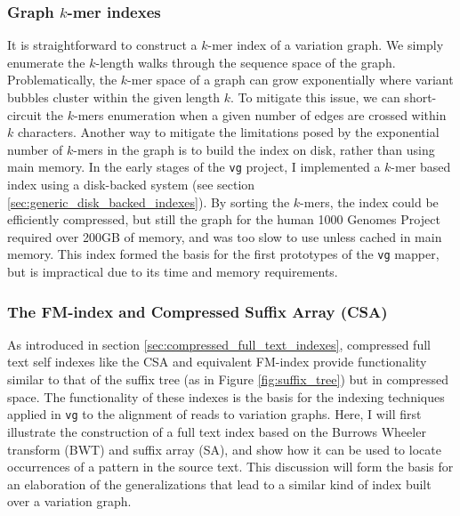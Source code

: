 \subsubsection{Graph $k$-mer indexes}

It is straightforward to construct a $k$-mer index of a variation graph.
We simply enumerate the $k$-length walks through the sequence space of the graph.
Problematically, the $k$-mer space of a graph can grow exponentially where variant bubbles cluster within the given length $k$.
To mitigate this issue, we can short-circuit the $k$-mers enumeration when a given number of edges are crossed within $k$ characters.
Another way to mitigate the limitations posed by the exponential number of $k$-mers in the graph is to build the index on disk, rather than using main memory.
In the early stages of the {\tt vg} project, I implemented a $k$-mer based index using a disk-backed system (see section \ref{sec:generic_disk_backed_indexes}).
By sorting the $k$-mers, the index could be efficiently compressed, but still the graph for the human 1000 Genomes Project required over 200GB of memory, and was too slow to use unless cached in main memory.
This index formed the basis for the first prototypes of the {\tt vg} mapper, but is impractical due to its time and memory requirements.

\subsubsection{The FM-index and Compressed Suffix Array (CSA)}
\label{sec:fmidx_csa}

As introduced in section \ref{sec:compressed_full_text_indexes}, compressed full text self indexes like the CSA and equivalent FM-index provide functionality similar to that of the suffix tree (as in Figure \ref{fig:suffix_tree}) but in compressed space.
The functionality of these indexes is the basis for the indexing techniques applied in {\tt vg} to the alignment of reads to variation graphs.
Here, I will first illustrate the construction of a full text index based on the Burrows Wheeler transform (BWT) and suffix array (SA), and show how it can be used to locate occurrences of a pattern in the source text.
This discussion will form the basis for an elaboration of the generalizations that lead to a similar kind of index built over a variation graph.

